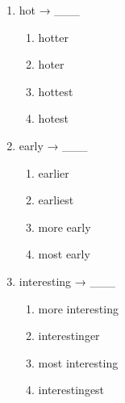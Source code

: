 \documentclass[11pt,a4paper]{ctexart}
\begin{document}
\begin{enumerate}[leftmargin=*,itemsep=4pt]
\begin{enumerate}[label=\Alph*.,leftmargin=2em,itemsep=1pt,topsep=2pt]
\item larger
\item largest
\item largger
\item larggest
\end{enumerate}
\item hot → \_\_\_
\begin{enumerate}[label=\Alph*.,leftmargin=2em,itemsep=1pt,topsep=2pt]
\item hotter
\item hoter
\item hottest
\item hotest
\end{enumerate}
\item early → \_\_\_
\begin{enumerate}[label=\Alph*.,leftmargin=2em,itemsep=1pt,topsep=2pt]
\item earlier
\item earliest
\item more early
\item most early
\end{enumerate}
\item interesting → \_\_\_
\begin{enumerate}[label=\Alph*.,leftmargin=2em,itemsep=1pt,topsep=2pt]
\item more interesting
\item interestinger
\item most interesting
\item interestingest
\end{enumerate}
\end{enumerate}
\end{document}
